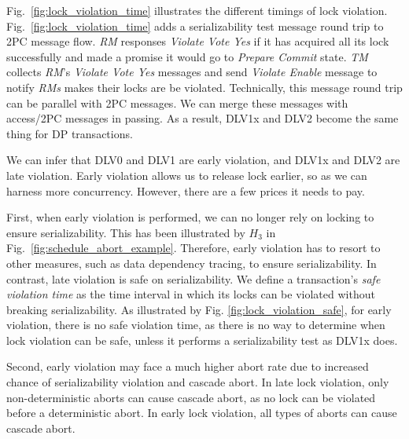 \documentclass[conference]{IEEEtran}
\begin{document}
Fig.~\ref{fig:lock_violation_time} illustrates the different timings of lock violation.
Fig.~\ref{fig:lock_violation_time} adds a serializability test message round trip to 2PC message flow.
\emph{RM} responses \emph{Violate Vote Yes} if it has acquired all its lock successfully and made a promise it would go to \emph{Prepare Commit} state.
\emph{TM} collects \emph{RM}'s \emph{Violate Vote Yes} messages and send \emph{Violate Enable} message to notify \emph{RMs} makes their locks are be violated.
Technically, this message round trip can be parallel with 2PC messages.
We can merge these messages with access/2PC messages in passing.
As a result, DLV1x and DLV2 become the same thing for DP transactions.

We can infer that DLV0 and DLV1 are early violation, and DLV1x and DLV2 are late violation.
Early violation allows us to release lock earlier, so as we can harness more concurrency. However, there are a few prices it needs to pay.

First, when early violation is performed, we can no longer rely on locking to ensure serializability. This has been illustrated by ${H_3}$ in Fig.~\ref{fig:schedule_abort_example}.
Therefore, early violation has to resort to other measures, such as data dependency tracing, to ensure serializability.
In contrast, late violation is safe on serializability.
We define a transaction's \emph{safe violation time} as the time interval in which its locks can be violated without breaking serializability.
As illustrated by Fig. \ref{fig:lock_violation_safe},
for early violation, there is no safe violation time, as there is no way to determine when lock violation can be safe, unless it performs a serializability test as DLV1x does.

Second, early violation may face a much higher abort rate due to increased chance of serializability violation and cascade abort.
In late lock violation, only non-deterministic aborts can cause cascade abort, as no lock can be violated before a deterministic abort.
In early lock violation, all types of aborts can cause cascade abort.
\end{document}
